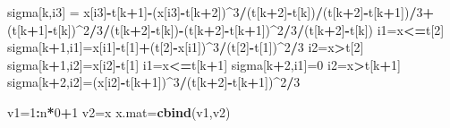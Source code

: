 \documentclass[11pt,]{article}
\newenvironment{Shaded}{\begin{snugshade}}{\end{snugshade}}
\newcommand{\KeywordTok}[1]{\textcolor[rgb]{0.13,0.29,0.53}{\textbf{#1}}}
\newcommand{\DecValTok}[1]{\textcolor[rgb]{0.00,0.00,0.81}{#1}}
\newcommand{\StringTok}[1]{\textcolor[rgb]{0.31,0.60,0.02}{#1}}
\newcommand{\OperatorTok}[1]{\textcolor[rgb]{0.81,0.36,0.00}{\textbf{#1}}}
\newcommand{\NormalTok}[1]{#1}
\begin{document}
\begin{Shaded}
\begin{Highlighting}[]
\NormalTok{  sigma[k,i3] =}\StringTok{ }\NormalTok{x[i3]}\OperatorTok{-}\NormalTok{t[k}\OperatorTok{+}\DecValTok{1}\NormalTok{]}\OperatorTok{-}\NormalTok{(x[i3]}\OperatorTok{-}\NormalTok{t[k}\OperatorTok{+}\DecValTok{2}\NormalTok{])}\OperatorTok{^}\DecValTok{3}\OperatorTok{/}\NormalTok{(t[k}\OperatorTok{+}\DecValTok{2}\NormalTok{]}\OperatorTok{-}\NormalTok{t[k])}\OperatorTok{/}\NormalTok{(t[k}\OperatorTok{+}\DecValTok{2}\NormalTok{]}\OperatorTok{-}\NormalTok{t[k}\OperatorTok{+}\DecValTok{1}\NormalTok{])}\OperatorTok{/}\DecValTok{3}\OperatorTok{+}\NormalTok{(t[k}\OperatorTok{+}\DecValTok{1}\NormalTok{]}\OperatorTok{-}\NormalTok{t[k])}\OperatorTok{^}\DecValTok{2}\OperatorTok{/}\DecValTok{3}\OperatorTok{/}\NormalTok{(t[k}\OperatorTok{+}\DecValTok{2}\NormalTok{]}\OperatorTok{-}\NormalTok{t[k])}\OperatorTok{-}\NormalTok{(t[k}\OperatorTok{+}\DecValTok{2}\NormalTok{]}\OperatorTok{-}\NormalTok{t[k}\OperatorTok{+}\DecValTok{1}\NormalTok{])}\OperatorTok{^}\DecValTok{2}\OperatorTok{/}\DecValTok{3}\OperatorTok{/}\NormalTok{(t[k}\OperatorTok{+}\DecValTok{2}\NormalTok{]}\OperatorTok{-}\NormalTok{t[k])}
\NormalTok{  i1=x}\OperatorTok{<=}\NormalTok{t[}\DecValTok{2}\NormalTok{]}
\NormalTok{  sigma[k}\OperatorTok{+}\DecValTok{1}\NormalTok{,i1]=x[i1]}\OperatorTok{-}\NormalTok{t[}\DecValTok{1}\NormalTok{]}\OperatorTok{+}\NormalTok{(t[}\DecValTok{2}\NormalTok{]}\OperatorTok{-}\NormalTok{x[i1])}\OperatorTok{^}\DecValTok{3}\OperatorTok{/}\NormalTok{(t[}\DecValTok{2}\NormalTok{]}\OperatorTok{-}\NormalTok{t[}\DecValTok{1}\NormalTok{])}\OperatorTok{^}\DecValTok{2}\OperatorTok{/}\DecValTok{3}
\NormalTok{  i2=x}\OperatorTok{>}\NormalTok{t[}\DecValTok{2}\NormalTok{]}
\NormalTok{  sigma[k}\OperatorTok{+}\DecValTok{1}\NormalTok{,i2]=x[i2]}\OperatorTok{-}\NormalTok{t[}\DecValTok{1}\NormalTok{]}
\NormalTok{  i1=x}\OperatorTok{<=}\NormalTok{t[k}\OperatorTok{+}\DecValTok{1}\NormalTok{]}
\NormalTok{  sigma[k}\OperatorTok{+}\DecValTok{2}\NormalTok{,i1]=}\DecValTok{0}
\NormalTok{  i2=x}\OperatorTok{>}\NormalTok{t[k}\OperatorTok{+}\DecValTok{1}\NormalTok{]}
\NormalTok{  sigma[k}\OperatorTok{+}\DecValTok{2}\NormalTok{,i2]=(x[i2]}\OperatorTok{-}\NormalTok{t[k}\OperatorTok{+}\DecValTok{1}\NormalTok{])}\OperatorTok{^}\DecValTok{3}\OperatorTok{/}\NormalTok{(t[k}\OperatorTok{+}\DecValTok{2}\NormalTok{]}\OperatorTok{-}\NormalTok{t[k}\OperatorTok{+}\DecValTok{1}\NormalTok{])}\OperatorTok{^}\DecValTok{2}\OperatorTok{/}\DecValTok{3}
  
\NormalTok{  v1=}\DecValTok{1}\OperatorTok{:}\NormalTok{n}\OperatorTok{*}\DecValTok{0}\OperatorTok{+}\DecValTok{1}
\NormalTok{  v2=x}
\NormalTok{  x.mat=}\KeywordTok{cbind}\NormalTok{(v1,v2)}
  

\end{Highlighting}
\end{Shaded}
\end{document}

